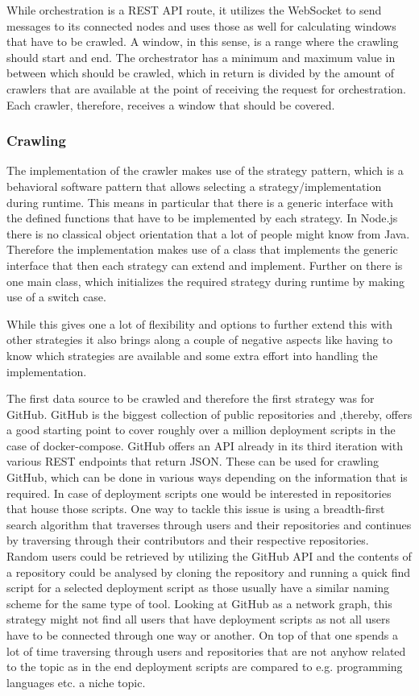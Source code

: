 While orchestration is a REST API route, it utilizes the WebSocket to send messages to its connected nodes and uses those as well for calculating windows that have to be crawled. A window, in this sense, is a range where the crawling should start and end. The orchestrator has a minimum and maximum value in between which should be crawled, which in return is divided by the amount of crawlers that are available at the point of receiving the request for orchestration. Each crawler, therefore, receives a window that should be covered.

\subsubsection{Crawling}
\label{sec:crawling}
The implementation of the crawler makes use of the strategy pattern, which is a behavioral software pattern that allows selecting a strategy/implementation during runtime. This means in particular that there is a generic interface with the defined functions that have to be implemented by each strategy. In Node.js there is no classical object orientation that a lot of people might know from Java. Therefore the implementation makes use of a class that implements the generic interface that then each strategy can extend and implement. Further on there is one main class, which initializes the required strategy during runtime by making use of a switch case.

While this gives one a lot of flexibility and options to further extend this with other strategies it also brings along a couple of negative aspects like having to know which strategies are available and some extra effort into handling the implementation.

The first data source to be crawled and therefore the first strategy was for GitHub. GitHub is the biggest collection of public repositories and ,thereby, offers a good starting point to cover roughly over a million deployment scripts in the case of docker-compose.
GitHub offers an API already in its third iteration with various REST endpoints that return JSON. These can be used for crawling GitHub, which can be done in various ways depending on the information that is required. In case of deployment scripts one would be interested in repositories that house those scripts.
One way to tackle this issue is using a breadth-first search algorithm that traverses through users and their repositories and continues by traversing through their contributors and their respective repositories. Random users could be retrieved by utilizing the GitHub API and the contents of a repository could be analysed by cloning the repository and running a quick find script for a selected deployment script as those usually have a similar naming scheme for the same type of tool. Looking at GitHub as a network graph, this strategy might not find all users that have deployment scripts as not all users have to be connected through one way or another. On top of that one spends a lot of time traversing through users and repositories that are not anyhow related to the topic as in the end deployment scripts are compared to e.g. programming languages etc. a niche topic.

